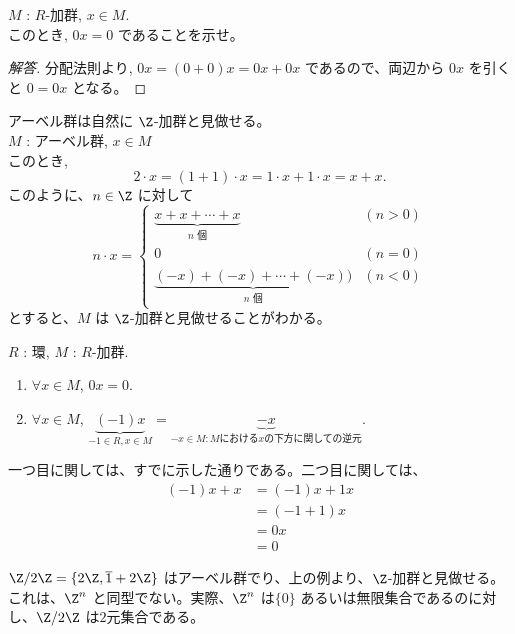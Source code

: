\documentclass[article,paper=a4paper]{jlreq}
\begin{document}
\begin{exe}
  \quad $M$ : $R$-加群, $x \in M$.\\
  このとき, $0x = 0$ であることを示せ。
\end{exe}

\begin{proof}[解答]
  分配法則より, 
  $0x = (0 + 0)x = 0x + 0x$ であるので、両辺から $0x$ を引くと $0 = 0x$ となる。
\end{proof}

\begin{ex}
  アーベル群は自然に $\Z$-\hspace{0pt}加群と見做せる。\\
  $M$ : アーベル群, $x \in M$\\
  このとき, 
  \[2\cdot x = (1+1)\cdot x = 1\cdot x + 1\cdot x = x+x.\]
  このように、$n \in \Z$ に対して 
  \[n\cdot x = \begin{cases}
  \underbrace{x + x + \cdots + x}_{n \text{ 個}} & (n > 0) \\
  0 & (n = 0) \\
  \underbrace{(-x) + (-x) + \cdots + (-x))}_{n \text{ 個}} & (n < 0)
  \end{cases}\]
  とすると、$M$ は $\Z$-\hspace{0pt}加群と見做せることがわかる。
\end{ex}

\begin{rem}
  \quad $R$ : 環, $M$ : $R$-加群.\\
  \begin{enumerate}
    \item $\forall x\in M$, $0x = 0$.
    \item $\forall x\in M$, $\underbrace{(-1)x}_{-1 \in R, x \in M} = \underbrace{-x}_{-x\in M : M\text{における}x\text{の下方に関しての逆元}}$.
  \end{enumerate}
  一つ目に関しては、すでに示した通りである。二つ目に関しては、
  \begin{align*}
    (-1)x + x &= (-1)x + 1x \\
    &= (-1 + 1)x \\
    &= 0x \\
    &= 0
  \end{align*}

  $\Z/2\Z = \{2\Z, \overline{1}+2\Z\}$ はアーベル群でり、上の例より、$\Z$-\hspace{0pt}加群と見做せる。これは、$\Z^n$ と同型でない。実際、$\Z^n$ は$\{0\}$ あるいは無限集合であるのに対し、$\Z/2\Z$ は$2$元集合である。
\end{rem}
\end{document}
